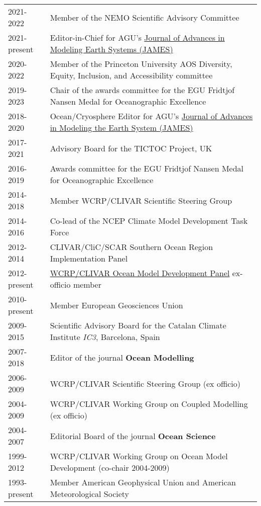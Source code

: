 \documentclass{article}
\begin{document}
\begin{tabular}{ll}

2021-2022 & Member of the NEMO Scientific Advisory Committee
\\
2021-present & Editor-in-Chief for  AGU's  \href{http://agupubs.onlinelibrary.wiley.com/hub/journal/10.1002/(ISSN)1942-2466/editorial-board/editorial-board.html}{Journal of Advances in Modeling Earth Systems (JAMES)} 
 \\
 2020-2022 & Member of the Princeton University AOS Diversity, Equity, Inclusion, and Accessibility committee
 \\
2019-2023 & Chair of the awards committee for the EGU Fridtjof Nansen Medal for Oceanographic Excellence 
\\
2018-2020 & Ocean/Cryosphere Editor for AGU's  \href{http://agupubs.onlinelibrary.wiley.com/hub/journal/10.1002/(ISSN)1942-2466/editorial-board/editorial-board.html}{Journal of Advances in Modeling the Earth System (JAMES)} 
\\
2017-2021 & Advisory Board for the TICTOC Project, UK
\\
  2016-2019 & Awards committee for the EGU Fridtjof Nansen Medal for Oceanographic Excellence 
  \\
2014-2018 &  Member  WCRP/CLIVAR Scientific Steering Group \\
2014-2016     & Co-lead of the NCEP Climate Model Development Task Force\\
2012-2014     & CLIVAR/CliC/SCAR Southern Ocean Region Implementation Panel \\
2012-present &  \href{http://www.clivar.org/clivar-panels/omdp}{WCRP/CLIVAR Ocean Model Development Panel} ex-officio member
\\
2010-present & Member European Geosciences Union \\
2009-2015     &  Scientific Advisory Board for the Catalan  Climate Institute {\it IC3}, Barcelona, Spain \\
2007-2018 & Editor of the journal {\bf Ocean Modelling} \\
2006-2009     &  WCRP/CLIVAR Scientific Steering Group (ex officio) \\
2004-2009     &  WCRP/CLIVAR Working Group on Coupled Modelling (ex officio) \\
2004-2007     & Editorial Board of the journal {\bf Ocean Science} \\
1999-2012     & WCRP/CLIVAR Working Group on Ocean Model Development  (co-chair 2004-2009) \\
1993-present  & Member American Geophysical Union and American Meteorological Society \\
\end{tabular}
\end{document}
